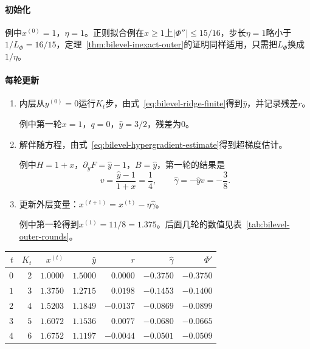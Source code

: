 \paragraph{初始化}
例中$x^{(0)}=1$，$\eta=1$。正则拟合例在$x\geq1$上$\lvert\Phi''\rvert\leq15/16$，步长$\eta=1$略小于$1/L_{\Phi}=16/15$，定理~\ref{thm:bilevel-inexact-outer}的证明同样适用，只需把$L_{\Phi}$换成$1/\eta$。

\paragraph{每轮更新}
\begin{enumerate}
 \item 内层从$y^{(0)}=0$运行$K_t$步，由式~\eqref{eq:bilevel-ridge-finite}得到$\hat{y}$，并记录残差$r$。

 例中第一轮$x=1$，$q=0$，$\hat{y}=3/2$，残差为$0$。

 \item 解伴随方程，由式~\eqref{eq:bilevel-hypergradient-estimate}得到超梯度估计。

 例中$H=1+x$，$\partial_yF=\hat{y}-1$，$B=\hat{y}$，第一轮的结果是
 \[
  v=\frac{\hat{y}-1}{1+x}=\frac14,\qquad\hat{\gamma}=-\hat{y}v=-\frac38.
 \]

 \item 更新外层变量：$x^{(t+1)}=x^{(t)}-\eta\hat{\gamma}$。

 例中第一轮得到$x^{(1)}=11/8=1.375$。后面几轮的数值见表~\ref{tab:bilevel-outer-rounds}。
\end{enumerate}

\begin{BookInlineTable}
 \centering
 \begin{tabular}{rrrrrrr}
  \toprule
  $t$ & $K_t$ & $x^{(t)}$ & $\hat{y}$ & $r$ & $\hat{\gamma}$ & $\Phi'$\\
  \midrule
  $0$ & $2$ & $1.0000$ & $1.5000$ & $0.0000$ & $-0.3750$ & $-0.3750$\\
  $1$ & $3$ & $1.3750$ & $1.2715$ & $0.0198$ & $-0.1453$ & $-0.1400$\\
  $2$ & $4$ & $1.5203$ & $1.1849$ & $-0.0137$ & $-0.0869$ & $-0.0899$\\
  $3$ & $5$ & $1.6072$ & $1.1536$ & $0.0077$ & $-0.0680$ & $-0.0665$\\
  $4$ & $6$ & $1.6752$ & $1.1197$ & $-0.0044$ & $-0.0501$ & $-0.0509$\\
  \bottomrule
 \end{tabular}
 \caption{正则拟合例的外层循环，$\eta=1$，内层步数$K_t=t+2$。最后一列是在当前$x^{(t)}$处的真实超梯度。}
 \label{tab:bilevel-outer-rounds}
\end{BookInlineTable}

